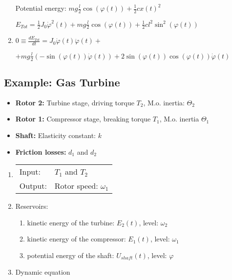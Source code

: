 \documentclass[10pt,a4paper]{scrartcl}
\begin{document}
\begin{multicols*}{3}
\begin{enumerate}
Potential energy: $mg\frac{l}{2}\cos(\varphi(t))+\frac{1}{2}cx(t)^2$

$E_{Tot}=\frac{1}{2}J_0\dot{\varphi}^2(t)+mg\frac{l}{2}\cos(\varphi(t))+\frac{1}{2}cl^2\sin^2(\varphi(t))$

\item $0\equiv\frac{dE_{Tot}}{dt}=J_0\dot{\varphi}(t)\ddot{\varphi}(t)+$ 

$+mg\frac{l}{2}\left(-\sin(\varphi(t))\dot{\varphi}(t)\right)+2\sin(\varphi(t))\cos(\varphi(t))\dot{\varphi}(t)$


\end{enumerate}

\newpage

\subsection{Example: Gas Turbine}


\scriptsize
\begin{itemize}
\item\textbf{Rotor 2:} Turbine stage, driving torque $T_2$, M.o. inertia: $\Theta_2$
\item\textbf{Rotor 1:} Compressor stage, breaking torque $T_1$, M.o. inertia $\Theta_1$
\item\textbf{Shaft:} Elasticity constant: $k$
\item\textbf{Friction losses:} $d_1$ and $d_2$
\end{itemize}
\normalsize


\begin{enumerate}
\item \begin{tabular}{ll}Input: & $T_1$ and $T_2$\\ Output: & Rotor speed: $\omega_1$\end{tabular}
\item Reservoirs:
\begin{enumerate}
\item kinetic energy of the turbine: $E_2(t)$, level: $\omega_2$
\item kinetic energy of the compressor: $E_1(t)$, level: $\omega_1$
\item potential energy of the shaft: $U_{shaft}(t)$, level: $\varphi$
\end{enumerate}
\item Dynamic equation


\end{enumerate}
\end{multicols*}
\end{document}
